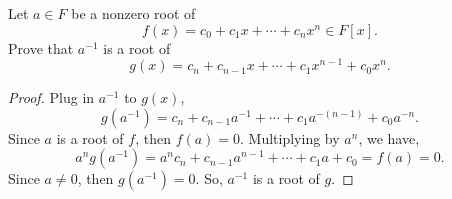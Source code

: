 \documentclass[../hw5]{subfiles}
\begin{document}
\begin{problem}
Let $a\in F$ be a nonzero root of \[
	f(x)=c_0+c_1x+\cdots+c_nx^n \in F[x]
	.\]
Prove that $a^{-1}$ is a root of \[
	g(x) = c_n + c_{n-1}x + \cdots+ c_1 x^{n-1} + c_0x^n
	.\]
\end{problem}
\begin{proof}
	Plug in $a^{-1}$ to $g(x)$, \[
		g(a^{-1})=c_n+c_{n-1}a^{-1}+\cdots+c_1a^{-(n-1)}+c_0 a^{-n}
		.\]
	Since $a$ is a root of  $f$, then  $f(a)=0$.
	Multiplying by $a^n$, we have, \[
		a^n g(a^{-1}) = a^{n}c_n + c_{n-1}a^{n-1}+\cdots+c_1 a + c_0 = f(a) = 0
		.\]
	Since $a\neq 0$, then $g(a^{-1})=0$.
	So, $a^{-1}$ is a root of $g$.
\end{proof}
\end{document}

